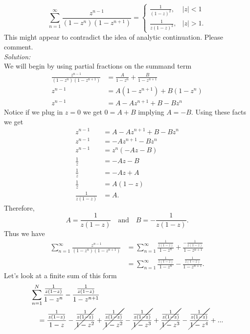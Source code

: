 \documentclass[10pt]{amsart}
\theoremstyle{nonumberplain}
\begin{document}
\begin{enumerate}[label={\bf {\arabic*}:}]
$$
\sum_{n=1}^{\infty} \frac{z^{n-1}}{\left(1-z^n\right)\left(1-z^{n+1}\right)}= \begin{cases}\frac{1}{(1-z)^2}, & |z|<1 \\ \frac{1}{z(1-z)^2}, & |z|>1 .\end{cases}
$$
This might appear to contradict the idea of analytic
continuation. Please comment.\\
\textit{Solution:} \\
We will begin by using partial fractions on the summand term
\begin{align*}
\frac{z^{n-1}}{\left(1-z^n\right)\left(1-z^{n+1}\right)} &= \frac A {1 - z^n} + \frac B {1 - z^{n + 1}} \\
z^{n-1} &= A(1 - z^{n + 1}) + B(1 - z^n) \\
z^{n-1} &= A - Az^{n + 1} + B -B z^n
\end{align*}
Notice if we plug in $z = 0$ we get $0 = A + B$ implying $A = -B$.
Using these facts we get
\begin{align*}
z^{n-1} &= A - Az^{n + 1} + B -B z^n \\
z^{n-1} &= - Az^{n + 1} - B z^n \\
z^{n-1} &= z^n(- Az - B) \\
\frac 1 z &= - Az - B \\
\frac 1 z &= - Az + A \\
\frac 1 z &= A(1 - z) \\
\frac 1 {z(1 - z)} &= A.
\end{align*}
Therefore, 
$$
A = \frac 1 {z(1 - z)} \quad \text{and} \quad B = -\frac 1 {z(1 - z)}.
$$
Thus we have
\begin{align*}
\sum_{n=1}^{\infty} \frac{z^{n-1}}{\left(1-z^n\right)\left(1-z^{n+1}\right)}
	&= \sum_{n=1}^{\infty} \frac {\frac 1 {z (1 - z)}}{1 - z^n} + \frac{-\frac 1 {z (1 - z)}}{1 - z^{n + 1}} \\
	&= \sum_{n=1}^{\infty} \frac {\frac 1 {z (1 - z)}}{1 - z^n} - \frac{\frac 1 {z (1 - z)}}{1 - z^{n + 1}}.
\end{align*}
Let's look at a finite sum of this form
\begin{align*}
& \sum_{n=1}^{N} \frac {\frac 1 {z (1 - z)}}{1 - z^n} - \frac{\frac 1 {z (1 - z)}}{1 - z^{n + 1}} \\
	& \quad = \frac {\frac 1 {z (1 - z)}}{1 - z} - \cancel{\frac{\frac 1 {z (1 - z)}}{1 - z^2}}
		+ \cancel{\frac {\frac 1 {z (1 - z)}}{1 - z^2}} - \cancel{\frac{\frac 1 {z (1 - z)}}{1 - z^3}}
		+ \cancel{\frac {\frac 1 {z (1 - z)}}{1 - z^3}} - \cancel{\frac{\frac 1 {z (1 - z)}}{1 - z^4}} + ...

\end{align*}
\end{enumerate}
\end{document}
